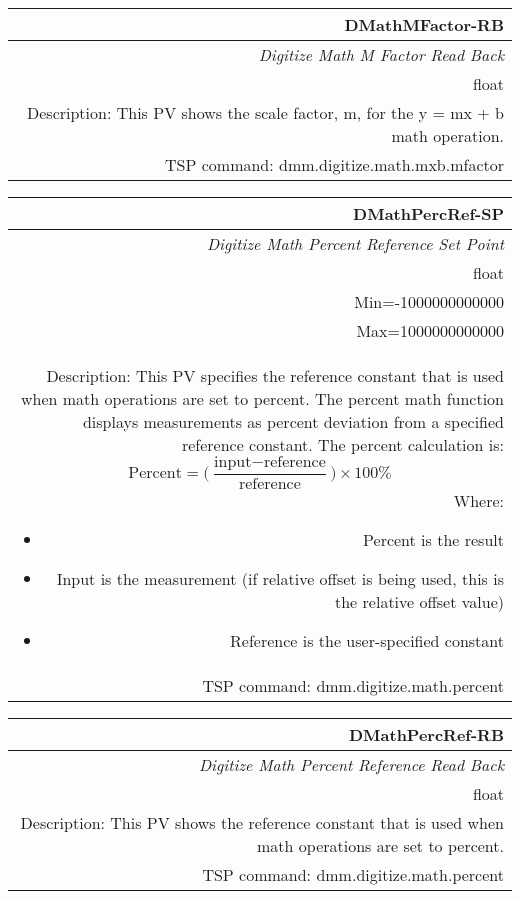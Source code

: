 \documentclass[openany]{article}
\begin{document}
		\begin{tabular}{N}
			\hline
			\bfseries DMathMFactor-RB\label{pv:dmathmfactor-rb} \\ \hline
			\emph{Digitize Math M Factor Read Back} \\
			float \\
			Description: This PV shows the scale factor, m, for the y = mx + b math operation. \\
			TSP command: dmm.digitize.math.mxb.mfactor
		\end{tabular}

		\begin{tabular}{N}
			\hline
			\bfseries DMathPercRef-SP\label{pv:dmathpercref-sp} \\ \hline
			\emph{Digitize Math Percent Reference Set Point} \\
			float \\
			Min=-1000000000000 \\
			Max=1000000000000 \\
			Description: This PV specifies the reference constant that is used when math operations are set to percent. The percent math function displays measurements as percent deviation from a specified reference constant. The percent calculation is: $$ \text{Percent} = \bigg(\frac{\text{input} - \text{reference}}{\text{reference}}\bigg)\times 100\% $$ Where: \begin{itemize} \item Percent is the result \item Input is the measurement (if relative offset is being used, this is the relative offset value) \item Reference is the user-specified constant \end{itemize} \\
			TSP command: dmm.digitize.math.percent
		\end{tabular}

		\begin{tabular}{N}
			\hline
			\bfseries DMathPercRef-RB\label{pv:dmathpercref-rb} \\ \hline
			\emph{Digitize Math Percent Reference Read Back} \\
			float \\
			Description: This PV shows the reference constant that is used when math operations are set to percent. \\
			TSP command: dmm.digitize.math.percent
		\end{tabular}

\end{document}
